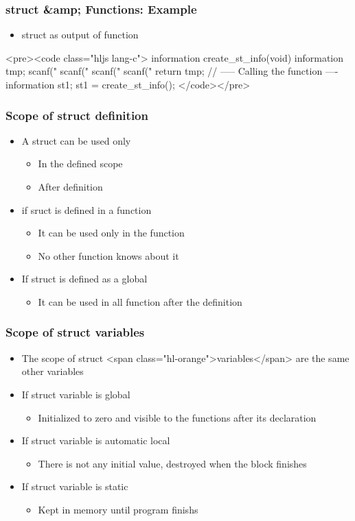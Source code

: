 \documentclass{../c-lecture}
\begin{document}
\begin{frame}
  \frametitle{struct &amp; Functions: Example}
  \begin{itemize}
    \item struct as output of function
  \end{itemize}
  <pre><code class="hljs lang-c">
information create_st_info(void) {
  information tmp;
  scanf("%
  scanf("%
  scanf("%
  scanf("%
  return tmp;
}
// ----- Calling the function ----
information st1;
st1 = create_st_info();
  </code></pre>
\end{frame}
\begin{frame}
  \frametitle{Scope of struct definition}
  \begin{itemize}
    \item A struct can be used only
    \begin{itemize}
      \item In the defined scope
      \item After definition
    \end{itemize}
    \item if sruct is defined in a function
    \begin{itemize}
      \item It can be used only in the function
      \item No other function knows about it
    \end{itemize}
    \item If struct is defined as a global
    \begin{itemize}
      \item It can be used in all function after the definition
    \end{itemize}
  \end{itemize}
\end{frame}
\begin{frame}
  \frametitle{Scope of struct variables}
  \begin{itemize}
    \item
      The scope of struct <span class="hl-orange">variables</span> are the same
      other variables

    \item If struct variable is global
    \begin{itemize}
      \item
        Initialized to zero and visible to the functions after its declaration

    \end{itemize}
    \item If struct variable is automatic local
    \begin{itemize}
      \item There is not any initial value, destroyed when the block finishes
    \end{itemize}
    \item If struct variable is static
    \begin{itemize}
      \item Kept in memory until program finishs
    \end{itemize}
  \end{itemize}
\end{frame}
\end{document}
